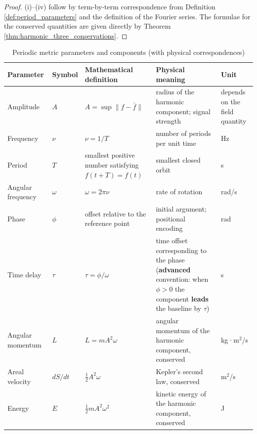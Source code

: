 \begin{proof}
(i)--(iv) follow by term-by-term correspondence from Definition \ref{def:period_parameters} and the definition of the Fourier series. The formulae for the conserved quantities are given directly by Theorem \ref{thm:harmonic_three_conservations}.
\end{proof}

\begin{table}[htbp]
    \centering
    \caption{Periodic metric parameters and components (with physical correspondences)}
    \label{tab:period_parameters}
    \begin{tabularx}{\linewidth}{@{}>{\raggedright\arraybackslash}p{2.3cm}>{\raggedright\arraybackslash}p{1.55cm}>{\raggedright\arraybackslash}X>{\raggedright\arraybackslash}X>{\raggedright\arraybackslash}p{2.1cm}@{}}
        \toprule
        Parameter & Symbol & Mathematical definition & Physical meaning & Unit \\
        \midrule
        Amplitude & $A$ & $A = \sup \|f - \bar{f}\|$ & radius of the harmonic component; signal strength & depends on the field quantity \\
        Frequency & $\nu$ & $\nu = 1/T$ & number of periods per unit time & Hz \\
        Period & $T$ & smallest positive number satisfying $f(t+T)=f(t)$ & smallest closed orbit & s \\
        Angular frequency & $\omega$ & $\omega = 2\pi \nu$ & rate of rotation & rad/s \\
        Phase & $\phi$ & offset relative to the reference point & initial argument; positional encoding & rad \\
        Time delay & $\tau$ & $\tau = \phi/\omega$ & time offset corresponding to the phase (\textbf{advanced} convention: when $\phi>0$ the component \textbf{leads} the baseline by $\tau$) & s \\
        Angular momentum & $L$ & $L = m A^2 \omega$ & angular momentum of the harmonic component, conserved & kg·m$^2$/s \\
        Areal velocity & $dS/dt$ & $\frac{1}{2}A^2\omega$ & Kepler's second law, conserved & m$^2$/s \\
        Energy & $E$ & $\frac{1}{2}m A^2 \omega^2$ & kinetic energy of the harmonic component, conserved & J \\
        \bottomrule
    \end{tabularx}
\end{table}

